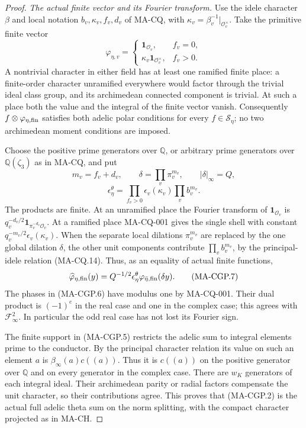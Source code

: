 \begin{proof}
\emph{The actual finite vector and its Fourier transform.}
Use the idele character $\beta$ and local notation
$b_v,\kappa_v,f_v,d_v$ of MA-CQ, with
$\kappa_v=\beta_v^{-1}|_{\mathcal O_v^\times}$.
Take the primitive finite vector
\[
 \varphi_{\eta,v}=
   \begin{cases}
     \mathbf1_{\mathcal O_v},&f_v=0,\\
     \kappa_v\mathbf1_{\mathcal O_v^\times},&f_v>0.
   \end{cases}
 \tag{MA-CGP.5}
\]
A nontrivial character in either field has at least one ramified
finite place: a finite-order character unramified everywhere
would factor through the trivial ideal class group, and its
archimedean connected component is trivial.  At such a place
both the value and the integral of the finite vector vanish.
Consequently $f\otimes\varphi_{\eta,\rm fin}$ satisfies
both adelic polar conditions for every $f\in\mathscr S_\eta$;
no two archimedean moment conditions are imposed.

Choose the positive prime generators over $\mathbb Q$, or
arbitrary prime generators over $\mathbb Q(\zeta_3)$ as in
MA-CQ, and put
\[
 m_v=f_v+d_v,\qquad
 \delta=\prod_v\pi_v^{m_v},\qquad |\delta|_\infty=Q,
\]
\[
 \epsilon_\eta^\theta
      =\prod_{f_v>0}\epsilon_v(\kappa_v)
                                      \prod_v b_v^{m_v}.
 \tag{MA-CGP.6}
\]
The products are finite.  At an unramified place the Fourier
transform of $\mathbf1_{\mathcal O_v}$ is
$q_v^{-d_v/2}\mathbf1_{\pi_v^{-d_v}\mathcal O_v}$.
At a ramified place MA-CQ-001 gives the single shell with
constant $q_v^{-m_v/2}\epsilon_v(\kappa_v)$.
When the separate local dilations $\pi_v^{m_v}$ are replaced
by the one global dilation $\delta$, the other unit components
contribute $\prod_v b_v^{m_v}$, by the principal-idele relation
(MA-CQ.14).  Thus, as an equality of actual finite functions,
\[
 \widehat\varphi_{\eta,\rm fin}(y)
       =Q^{-1/2}\epsilon_\eta^\theta
                                \varphi_{\bar\eta,\rm fin}(\delta y).
 \tag{MA-CGP.7}
\]
The phases in (MA-CGP.6) have modulus one by MA-CQ-001.
Their dual product is $(-1)^e$ in the real case and one in
the complex case; this agrees with $\mathcal F_\infty^2$.
In particular the odd real case has not lost its Fourier sign.

The finite support in (MA-CGP.5) restricts the adelic sum to
integral elements prime to the conductor.  By the principal
character relation its value on such an element $a$ is
$\beta_\infty(a)c((a))$.  Thus it is $c((a))$ on the
positive generator over $\mathbb Q$ and on every generator
in the complex case.  There are $w_K$ generators of each integral ideal.
Their archimedean parity or radial factors compensate the unit
character, so their contributions agree.  This proves that
(MA-CGP.2) is the actual full adelic theta sum on the norm
splitting, with the compact character projected as in MA-CH.


\end{proof}
